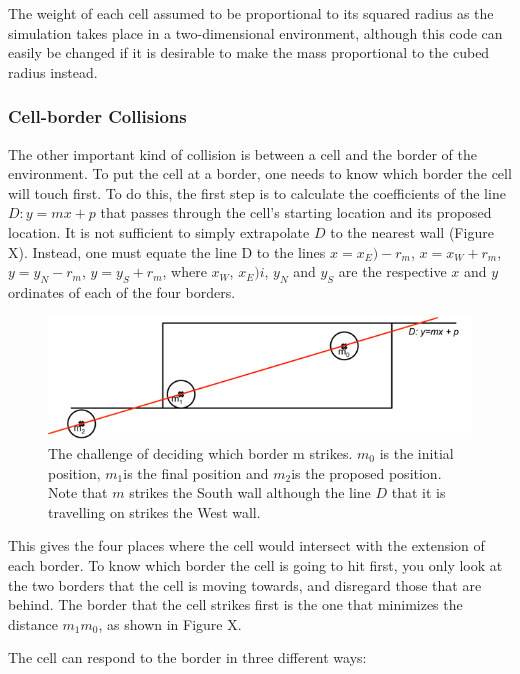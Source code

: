 \documentclass[12pt]{article}
\begin{document}
The weight of each cell assumed to be proportional to its squared radius 
as the simulation takes place in a two-dimensional environment, although 
this code can easily be changed if it is desirable to make the mass 
proportional to the cubed radius instead.

\subsubsection{Cell-border Collisions}
The other important kind of collision is between a cell and the border 
of the environment. To put the cell at a border, one needs to know which 
border the cell will touch first. To do this, the first step is to 
calculate the coefficients of the line \(D: y=mx + p\) that passes through 
the cell's starting location and its proposed location. It is not 
sufficient to simply extrapolate \(D\) to the nearest wall (Figure X). 
Instead, one must equate the line D to the lines 
\(x = x_E) - r_m\), \(x = x_W + r_m\), \(y = y_N - r_m\), \(y = y_S + r_m\), 
where \(x_W\), \(x_E)i\), \(y_N\) and \(y_S\) are the respective \(x\) 
and \(y\) ordinates of each of the four borders.

\begin{figure}[H]
\centering
\includegraphics[width=14.98cm]{media/wall.png}
\caption{The challenge of deciding which border m 
  strikes. \(m_0\) is the initial position, \(m_1\)is the final 
  position and \(m_2\)is the proposed position. Note that \(m\) strikes 
  the South wall although the line \(D\) that it is travelling on strikes the 
West wall.}
\end{figure}

This gives the four places where the cell would intersect with the 
extension of each border. To know which border the cell is going to hit 
first, you only look at the two borders that the cell is moving towards, 
and disregard those that are behind. The border that the cell strikes 
first is the one that minimizes the distance \(m_1m_0\), as 
shown in Figure X. 

The cell can respond to the border in three different ways: 
\end{document}
